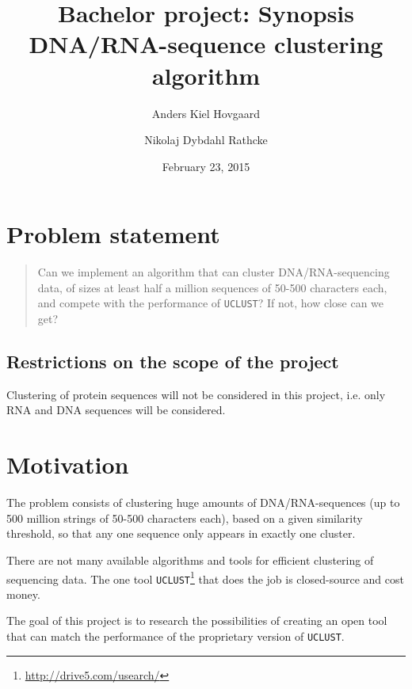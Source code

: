 \documentclass[12pt,a4paper]{article}
\title{Bachelor project: Synopsis \\ \vspace{2mm}
      {\LARGE DNA/RNA-sequence clustering algorithm}}
\author{Anders Kiel Hovgaard \and Nikolaj Dybdahl Rathcke}
\date{February 23, 2015}
\begin{document}
\maketitle
\thispagestyle{fancy}

\section{Problem statement}
\begin{quotation}
  Can we implement an algorithm that can cluster DNA/RNA-sequencing data, of
  sizes at least half a million sequences of 50-500 characters each, and
  compete with the performance of \texttt{UCLUST}? If not, how close can we
  get?
\end{quotation}



\subsection{Restrictions on the scope of the project}
Clustering of protein sequences will not be considered in this project, i.e.
only RNA and DNA sequences will be considered.


\section{Motivation}
The problem consists of clustering huge amounts of DNA/RNA-sequences (up to 500
million strings of 50-500 characters each), based on a given similarity
threshold, so that any one sequence only appears in exactly one cluster.
 
There are not many available algorithms and tools for efficient clustering of
sequencing data. The one tool
\texttt{UCLUST}\footnote{\url{http://drive5.com/usearch/}} that does the job is
closed-source and cost money.

The goal of this project is to research the possibilities of creating an open
tool that can match the performance of the proprietary version of
\texttt{UCLUST}.
\end{document}
